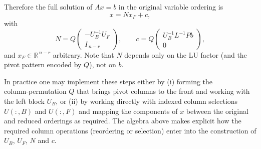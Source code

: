 \documentclass{article}
\begin{document}
Therefore the full solution of \(Ax=b\) in the original variable ordering is
\[
x = N x_F + c,
\]
with
\[
N = Q\begin{pmatrix}-U_B^{-1}U_F\\[3pt] I_{\,n-r}\end{pmatrix},\qquad
c = Q\begin{pmatrix}U_B^{-1}L^{-1}Pb\\[3pt]0\end{pmatrix},
\]
and \(x_F\in\mathbb{R}^{\,n-r}\) arbitrary. Note that \(N\) depends only on the LU factor (and the pivot pattern encoded by \(Q\)), not on \(b\).

In practice one may implement these steps either by (i) forming the column‑permutation \(Q\) that brings pivot columns to the front and working with the left block \(U_B\), or (ii) by working directly with indexed column selections \(U(:,B)\) and \(U(:,F)\) and mapping the components of \(x\) between the original and reduced orderings as required. The algebra above makes explicit how the required column operations (reordering or selection) enter into the construction of \(U_B\), \(U_F\), \(N\) and \(c\).
\end{document}
